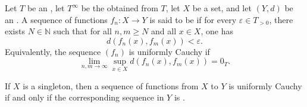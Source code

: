 \begin{definition} \label{definition:uniformly_Cauchy_sequence_of_functions_from_a_set_to_an_extended_metric_space}
    Let $T$ be an , let $T^\infty$ be the  obtained from $T$, let $X$ be a set, and let $(Y, d)$ be an .
    A sequence of functions $f_n : X \to Y$ is said to be  if for every $\varepsilon \in T_{>0}$, there exists $N \in \mathbb{N}$ such that for all $n, m \geq N$ and all $x \in X$, one has
    $$d(f_n(x), f_m(x)) < \varepsilon.$$
    Equivalently, the sequence $(f_n)$ is uniformly Cauchy if
    $$\lim_{n,m \to \infty} \sup_{x \in X} d(f_n(x), f_m(x)) = 0_T.$$

    If $X$ is a singleton, then a sequence of functions from $X$ to $Y$ is uniformly Cauchy if and only if the corresponding sequence in $Y$ is .
\end{definition}
